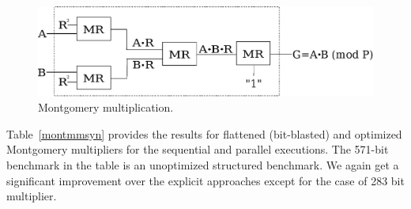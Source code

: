 \begin{figure}[H]
  \centering
  \includegraphics[scale=0.34]{new_mmcircuit}
  \caption{Montgomery multiplication.}
  \label{montfig}
  \end{figure}



\par Table~\ref{montmmsyn} provides the results for flattened (bit-blasted) and optimized Montgomery multipliers for the sequential and parallel executions. 
The 571-bit benchmark in the table is an unoptimized structured benchmark. We again get a significant improvement over the explicit approaches except for the case of 283 bit multiplier. 


